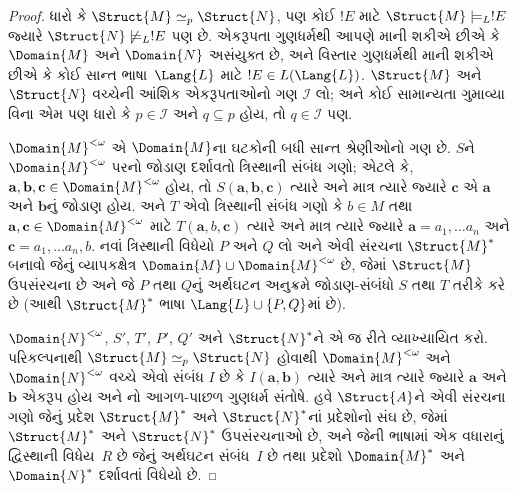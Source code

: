 \begin{proof}
ધારો કે $\Struct{M} \simeq_p \Struct{N}$, પણ કોઈ $!E$ માટે
$\Struct{M} \models_L !E$ જ્યારે $\Struct{N} \not\models_L !E$ પણ છે.
એકરૂપતા ગુણધર્મથી આપણે માની શકીએ છીએ કે $\Domain{M}$ અને $\Domain{N}$
અસંયુક્ત છે, અને વિસ્તાર ગુણધર્મથી માની શકીએ છીએ કે કોઈ સાન્ત
ભાષા~$\Lang{L}$ માટે $!E \in L(\Lang{L})$. $\Struct{M}$ અને
$\Struct{N}$ વચ્ચેની આંશિક એકરૂપતાઓનો ગણ $\mathcal{I}$ લો; અને કોઈ
સામાન્યતા ગુમાવ્યા વિના એમ પણ ધારો કે $p \in \mathcal{I}$ અને $q
\subseteq p$ હોય, તો $q \in \mathcal{I}$ પણ.

$\Domain{M}^{<\omega}$ એ $\Domain{M}$ના ઘટકોની બધી સાન્ત
શ્રેણીઓનો ગણ છે. $S$ને $\Domain{M}^{<\omega}$ પરનો જોડાણ દર્શાવતો
ત્રિસ્થાની સંબંધ ગણો; એટલે કે, $\mathbf{a}, \mathbf{b}, \mathbf{c}
\in \Domain{M}^{<\omega}$ હોય, તો $S(\mathbf{a}, \mathbf{b},
\mathbf{c})$ ત્યારે અને માત્ર ત્યારે જ્યારે $\mathbf{c}$ એ
$\mathbf{a}$ અને $\mathbf{b}$નું જોડાણ હોય. અને $T$ એવો ત્રિસ્થાની
સંબંધ ગણો કે $b \in M$ તથા $\mathbf{a}, \mathbf{c} \in
\Domain{M}^{<\omega}$ માટે $T(\mathbf{a}, b, \mathbf{c})$ ત્યારે અને
માત્ર ત્યારે જ્યારે $\mathbf{a} = a_1, \dots a_n$ અને
$\mathbf{c} = a_1, \dots a_n, b$. નવાં ત્રિસ્થાની વિધેયો
$P$ અને $Q$ લો અને એવી સંરચના $\Struct{M}^*$ બનાવો જેનું
વ્યાપકક્ષેત્ર $\Domain{M} \cup \Domain{M}^{<\omega}$ છે, જેમાં
$\Struct{M}$ ઉપસંરચના છે અને જે $P$ તથા $Q$નું અર્થઘટન અનુક્રમે
જોડાણ-સંબંધો $S$ તથા $T$ તરીકે કરે છે (આથી $\Struct{M}^*$ ભાષા
$\Lang{L} \cup \{ P, Q\}$માં છે).

$\Domain{N}^{<\omega}$, $S'$, $T'$, $P'$, $Q'$ અને
$\Struct{N}^*$ને એ જ રીતે વ્યાખ્યાયિત કરો. પરિકલ્પનાથી $\Struct{M}
\simeq_p \Struct{N}$ હોવાથી $\Domain{M}^{<\omega}$ અને
$\Domain{N}^{<\omega}$ વચ્ચે એવો સંબંધ $I$ છે કે
$I(\mathbf{a}, \mathbf{b})$ ત્યારે અને માત્ર ત્યારે જ્યારે
$\mathbf{a}$ અને $\mathbf{b}$ એકરૂપ હોય અને
નો આગળ-પાછળ ગુણધર્મ સંતોષે. હવે
$\Struct{A}$ને એવી સંરચના ગણો જેનું પ્રદેશ
$\Struct{M}^*$ અને $\Struct{N}^*$નાં પ્રદેશોનો સંઘ છે, જેમાં
$\Struct{M}^*$ અને $\Struct{N}^*$ ઉપસંરચનાઓ છે, અને જેની
ભાષામાં એક વધારાનું દ્વિસ્થાની વિધેય~$R$ છે જેનું
અર્થઘટન સંબંધ~$I$ છે તથા પ્રદેશો $\Domain{M}^*$ અને $\Domain{N}^*$ દર્શાવતાં
વિધેયો છે.


\end{proof}
